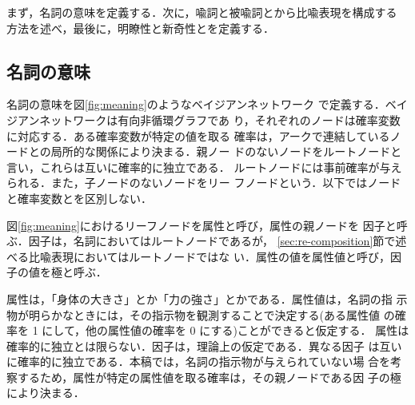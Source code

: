 まず，名詞の意味を定義する．次に，喩詞と被喩詞とから比喩表現を構成する
方法を述べ，最後に，明瞭性と新奇性とを定義する．

\subsection{名詞の意味}
\label{sec:meaning}

名詞の意味を図\ref{fig:meaning}のようなベイジアンネットワーク
\cite{Pearl88}で定義する．ベイジアンネットワークは有向非循環グラフであ
り，それぞれのノードは確率変数に対応する．ある確率変数が特定の値を取る
確率は，アークで連結しているノードとの局所的な関係により決まる．親ノー
ドのないノードをルートノードと言い，これらは互いに確率的に独立である．
ルートノードには事前確率が与えられる．また，子ノードのないノードをリー
フノードという．以下ではノードと確率変数とを区別しない．

図\ref{fig:meaning}におけるリーフノードを属性と呼び，属性の親ノードを
因子と呼ぶ．因子は，名詞においてはルートノードであるが，
\ref{sec:re-composition}節で述べる比喩表現においてはルートノードではな
い．属性の値を属性値と呼び，因子の値を極と呼ぶ．

属性は，「身体の大きさ」とか「力の強さ」とかである．属性値は，名詞の指
示物が明らかなときには，その指示物を観測することで決定する(ある属性値
の確率を 1 にして，他の属性値の確率を 0 にする)ことができると仮定する．
属性は確率的に独立とは限らない．因子は，理論上の仮定である．異なる因子
は互いに確率的に独立である．本稿では，名詞の指示物が与えられていない場
合を考察するため，属性が特定の属性値を取る確率は，その親ノードである因
子の極により決まる．

